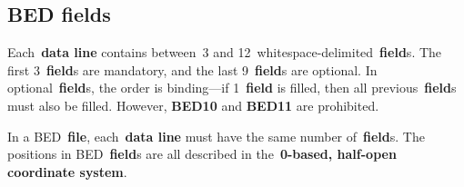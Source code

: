 \documentclass[11pt]{article}
\begin{document}
\subsection{\acs{BED} fields}

Each~\textbf{data line} contains between~3 and 12~whitespace-delimited~\textbf{field}s.
The first 3~\textbf{field}s are mandatory, and the last 9~\textbf{field}s are optional.
In optional~\textbf{field}s, the order is binding---if 1~\textbf{field} is filled, then all previous~\textbf{field}s must also be filled.
However, \textbf{BED10} and \textbf{BED11} are prohibited.

In a \ac{BED}~\textbf{file}, each~\textbf{data line} must have the same number of~\textbf{field}s.
The positions in \ac{BED}~\textbf{field}s are all described in the~\textbf{0-based, half-open coordinate system}.
\end{document}
